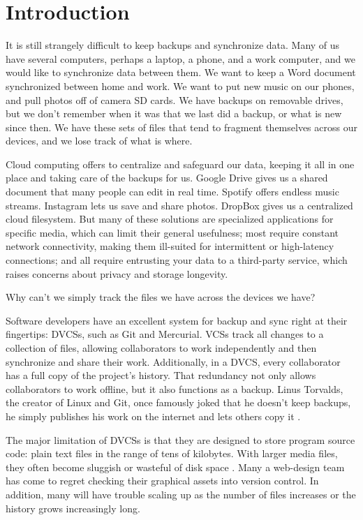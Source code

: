 \chapter{Introduction}

It is still strangely difficult to keep backups and synchronize data. Many of us
have several computers, perhaps a laptop, a phone, and a work computer, and we
would like to synchronize data between them. We want to keep a Word document
synchronized between home and work. We want to put new music on our phones, and
pull photos off of camera SD cards. We have backups on removable drives, but we
don't remember when it was that we last did a backup, or what is new since then.
We have these sets of files that tend to fragment themselves across our devices,
and we lose track of what is where.

Cloud computing offers to centralize and safeguard our data, keeping it all in
one place and taking care of the backups for us. Google Drive gives us a shared
document that many people can edit in real time. Spotify offers endless music
streams. Instagram lets us save and share photos. DropBox gives us a centralized
cloud filesystem. But many of these solutions are specialized applications for
specific media, which can limit their general usefulness; most require constant
network connectivity, making them ill-suited for intermittent or high-latency
connections; and all require entrusting your data to a third-party service,
which raises concerns about privacy and storage longevity.

Why can't we simply track the files we have across the devices we have?

Software developers have an excellent system for backup and sync right at their
fingertips: \glspl{DVCS}, such as Git and Mercurial. \Glspl{VCS} track all
changes to a collection of files, allowing collaborators to work independently
and then synchronize and share their work. Additionally, in a \gls{DVCS}, every
collaborator has a full copy of the project's history. That redundancy not only
allows collaborators to work offline, but it also functions as a backup. Linus
Torvalds, the creator of Linux and Git, once famously joked that he doesn't keep
backups, he simply publishes his work on the internet and lets others copy it
\cite{linus_no_backups}.

The major limitation of \glspl{DVCS} is that they are designed to store program
source code: plain text files in the range of tens of kilobytes. With larger
media files, they often become sluggish or wasteful of disk space . Many a web-design team has come to
regret checking their graphical assets into version control.
In addition, many will have trouble scaling up  as
the number of files increases or the history grows increasingly long.

